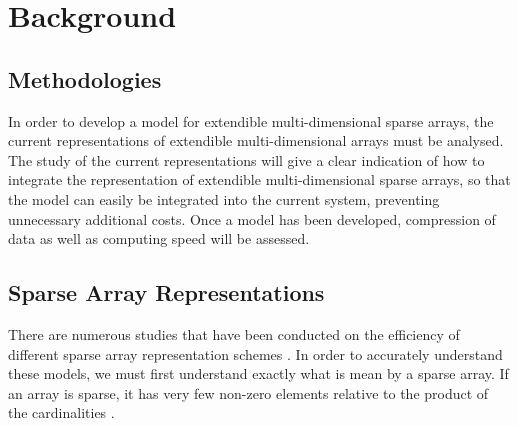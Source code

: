 %
%
%
%
%
\chapter{Background} \label{chap:background}
\vspace{-1cm}








\section{Methodologies}
In order to develop a model for extendible multi-dimensional sparse arrays, the current representations of extendible multi-dimensional arrays must be analysed. The study of the current representations will give a clear indication of how to integrate the representation of extendible multi-dimensional sparse arrays, so that the model can easily be integrated into the current system, preventing unnecessary additional costs. Once a model has been developed, compression of data as well as computing speed will be assessed.

\section{Sparse Array Representations}
There are numerous studies that have been conducted on the efficiency of different sparse array representation schemes \cite{wang:2014sar,goil:bess}. In order to accurately understand these models, we must first understand exactly what is mean by a sparse array. If an array is sparse, it has very few non-zero elements relative to the product of the cardinalities \cite{wang:2014sar}.

